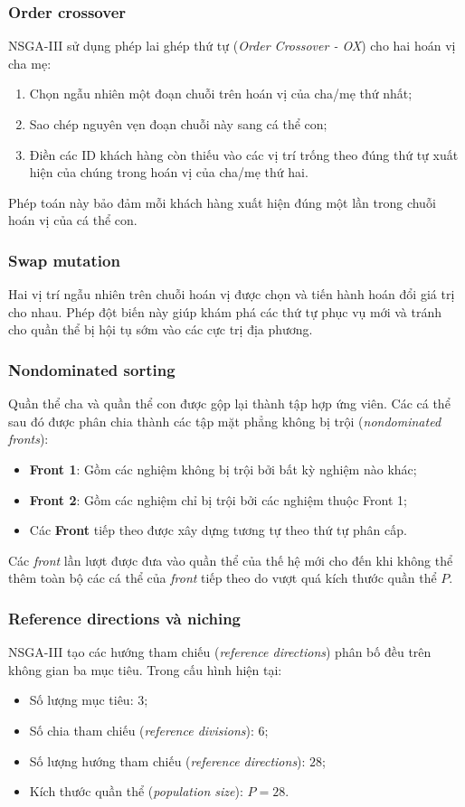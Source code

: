 \documentclass{article}
\begin{document}
\subsubsection{Order crossover}
NSGA-III sử dụng phép lai ghép thứ tự (\textit{Order Crossover - OX}) cho hai hoán vị cha mẹ:
\begin{enumerate}
    \item Chọn ngẫu nhiên một đoạn chuỗi trên hoán vị của cha/mẹ thứ nhất;
    \item Sao chép nguyên vẹn đoạn chuỗi này sang cá thể con;
    \item Điền các ID khách hàng còn thiếu vào các vị trí trống theo đúng thứ tự xuất hiện của chúng trong hoán vị của cha/mẹ thứ hai.
\end{enumerate}
Phép toán này bảo đảm mỗi khách hàng xuất hiện đúng một lần trong chuỗi hoán vị của cá thể con.

\subsubsection{Swap mutation}
Hai vị trí ngẫu nhiên trên chuỗi hoán vị được chọn và tiến hành hoán đổi giá trị cho nhau. Phép đột biến này giúp khám phá các thứ tự phục vụ mới và tránh cho quần thể bị hội tụ sớm vào các cực trị địa phương.

\subsubsection{Nondominated sorting}
Quần thể cha và quần thể con được gộp lại thành tập hợp ứng viên. Các cá thể sau đó được phân chia thành các tập mặt phẳng không bị trội (\textit{nondominated fronts}):
\begin{itemize}
    \item \textbf{Front 1}: Gồm các nghiệm không bị trội bởi bất kỳ nghiệm nào khác;
    \item \textbf{Front 2}: Gồm các nghiệm chỉ bị trội bởi các nghiệm thuộc Front 1;
    \item Các \textbf{Front} tiếp theo được xây dựng tương tự theo thứ tự phân cấp.
\end{itemize}
Các \textit{front} lần lượt được đưa vào quần thể của thế hệ mới cho đến khi không thể thêm toàn bộ các cá thể của \textit{front} tiếp theo do vượt quá kích thước quần thể $P$.

\subsubsection{Reference directions và niching}
NSGA-III tạo các hướng tham chiếu (\textit{reference directions}) phân bố đều trên không gian ba mục tiêu. Trong cấu hình hiện tại:
\begin{itemize}
    \item Số lượng mục tiêu: $3$;
    \item Số chia tham chiếu (\textit{reference divisions}): $6$;
    \item Số lượng hướng tham chiếu (\textit{reference directions}): $28$;
    \item Kích thước quần thể (\textit{population size}): $P = 28$.
\end{itemize}
\end{document}
